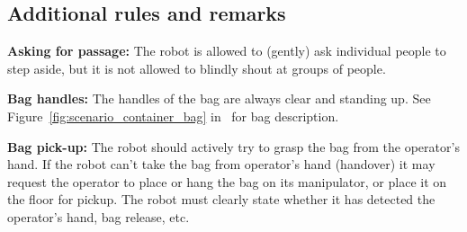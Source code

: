 \subsection{Additional rules and remarks}
\begin{enumerate}
  \begin{minipage}{0.65\textwidth}
  \item \textbf{Asking for passage:} The robot is allowed to (gently) ask individual people to step aside, but it is not allowed to blindly shout at groups of people.

  \item \textbf{Bag handles:} The handles of the bag are always clear and standing up. See Figure~\ref{fig:scenario_container_bag} in~ for bag description. \footnotemark

  \item \textbf{Bag pick-up:} The robot should actively try to grasp the bag from the operator's hand.
  If the robot can't take the bag from operator's hand (handover) it may request the operator to place or hang the bag on its manipulator, or place it on the floor for pickup.
  The robot must clearly state whether it has detected the operator's hand, bag release, etc.


\end{minipage}
\end{enumerate}
